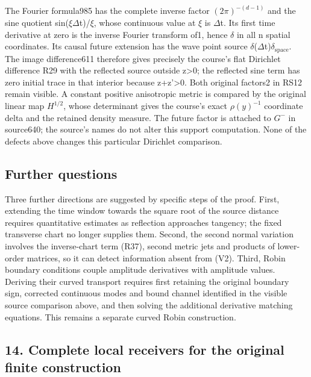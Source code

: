 \documentclass[
  11pt,
]{article}
\begin{document}
The Fourier formula985 has the complete inverse factor
\ensuremath{(2\pi)^{-(d-1)}} and the sine quotient
sin(\textbar \ensuremath{\xi}\textbar \ensuremath{\Delta}t)/\textbar \ensuremath{\xi}\textbar, whose continuous value at
\textbar \ensuremath{\xi} is \ensuremath{\Delta}t. Its first time derivative at zero is the
inverse Fourier transform of1, hence \ensuremath{\delta} in all n spatial coordinates. Its
causal future extension has the wave point source \ensuremath{\delta}(\ensuremath{\Delta}t)\ensuremath{\delta_{\mathrm{space}}}. The
image difference611 therefore gives precisely the course's flat
Dirichlet difference R29 with the reflected source outside
z\textgreater0; the reflected sine term has zero initial trace in that
interior because z+z'\textgreater0. Both original factors2 in RS12
remain visible. A constant positive anisotropic metric is compared by
the original linear map \ensuremath{H^{1/2}}, whose determinant gives the
course's exact \ensuremath{\rho(y)^{-1}} coordinate delta and the retained density
measure. The future factor is attached to \ensuremath{G^-} in source640; the
source's names do not alter this support computation. None of the
defects above changes this particular Dirichlet comparison.

\subsection{Further questions}\label{further-questions}

Three further directions are suggested by specific steps of the proof.
First, extending the time window towards the square root of the source
distance requires quantitative estimates as reflection approaches
tangency; the fixed transverse chart no longer supplies them. Second,
the second normal variation involves the inverse-chart term (R37),
second metric jets and products of lower-order matrices, so it can
detect information absent from (V2). Third, Robin boundary conditions
couple amplitude derivatives with amplitude values. Deriving their
curved transport requires first retaining the original boundary sign,
corrected continuous modes and bound channel identified in the visible
source comparison above, and then solving the additional derivative
matching equations. This remains a separate curved Robin construction.

\subsection{14. Complete local receivers for the original finite
construction}\label{complete-local-receivers-for-the-original-finite-construction}
\end{document}
